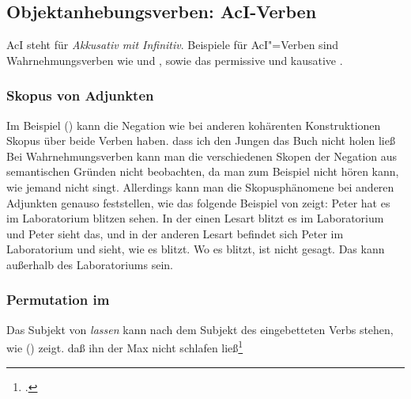 \subsection{Objektanhebungsverben: AcI-Verben}
\label{sec-aci}

AcI
steht für \emph{Akkusativ mit Infinitiv}. 
Beispiele für AcI"=Verben sind Wahrnehmungsverben wie  und 
, sowie das permissive und kausative . 

\subsubsection{Skopus von Adjunkten}
\label{sec-aci-scope}

Im Beispiel () kann die Negation wie bei anderen kohärenten Konstruktionen
Skopus über beide Verben haben.
\ea
dass ich den Jungen das Buch nicht holen ließ
\z
%
Bei Wahrnehmungsverben kann man die verschiedenen Skopen der Negation
aus semantischen Gründen nicht beobachten, da man zum Beispiel
nicht hören kann, wie jemand nicht singt. Allerdings kann man
die Skopusphänomene bei anderen Adjunkten genauso feststellen, wie
das folgende Beispiel von \citet[]{Puetz82a} zeigt:
\ea
Peter hat es im Laboratorium blitzen sehen.
\z
In der einen Lesart blitzt es im Laboratorium und Peter sieht das, und
in der anderen Lesart befindet sich Peter im Laboratorium und sieht,
wie es blitzt. Wo es blitzt, ist nicht gesagt. Das kann außerhalb
des Laboratoriums sein.


\subsubsection{Permutation im \mf}
\label{sec-aci-perm-mf}


Das Subjekt von \emph{lassen} kann nach dem Subjekt des eingebetteten Verbs stehen, wie ()
zeigt.
\ea
daß ihn der Max nicht schlafen ließ\footnote{
        .
}
\z

